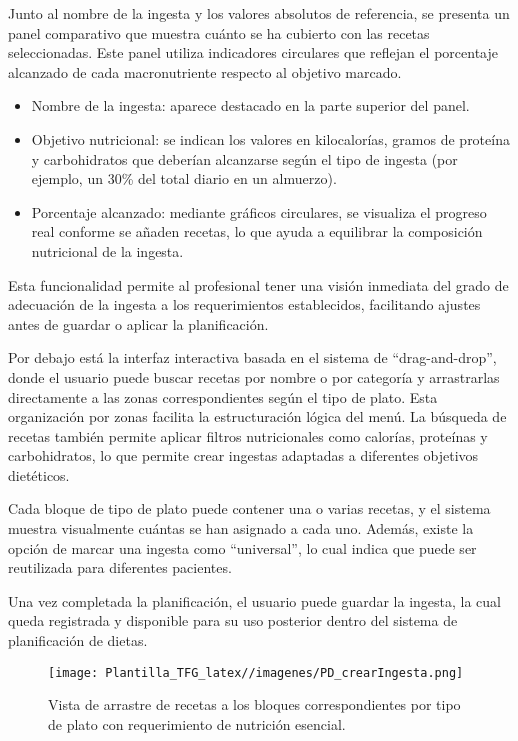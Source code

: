 Junto al nombre de la ingesta y los valores absolutos de referencia, se presenta un panel comparativo que muestra cuánto se ha cubierto con las recetas seleccionadas. Este panel utiliza indicadores circulares que reflejan el porcentaje alcanzado de cada macronutriente respecto al objetivo marcado.

\begin{itemize}
    \item Nombre de la ingesta: aparece destacado en la parte superior del panel.
    \item Objetivo nutricional: se indican los valores en kilocalorías, gramos de proteína y carbohidratos que deberían alcanzarse según el tipo de ingesta (por ejemplo, un 30\% del total diario en un almuerzo).
    \item Porcentaje alcanzado: mediante gráficos circulares, se visualiza el progreso real conforme se añaden recetas, lo que ayuda a equilibrar la composición nutricional de la ingesta.
\end{itemize}

Esta funcionalidad permite al profesional tener una visión inmediata del grado de adecuación de la ingesta a los requerimientos establecidos, facilitando ajustes antes de guardar o aplicar la planificación.

Por debajo está la interfaz interactiva basada en el sistema de ``drag-and-drop'', donde el usuario puede buscar recetas por nombre o por categoría y arrastrarlas directamente a las zonas correspondientes según el tipo de plato. Esta organización por zonas facilita la estructuración lógica del menú. La búsqueda de recetas también permite aplicar filtros nutricionales como calorías, proteínas y carbohidratos, lo que permite crear ingestas adaptadas a diferentes objetivos dietéticos.

Cada bloque de tipo de plato puede contener una o varias recetas, y el sistema muestra visualmente cuántas se han asignado a cada uno. Además, existe la opción de marcar una ingesta como ``universal'', lo cual indica que puede ser reutilizada para diferentes pacientes.

Una vez completada la planificación, el usuario puede guardar la ingesta, la cual queda registrada y disponible para su uso posterior dentro del sistema de planificación de dietas.

\begin{figure}[t]
    \centering
    \texttt{[image: Plantilla\_TFG\_latex//imagenes/PD\_crearIngesta.png]}
    \caption{Vista de arrastre de recetas a los bloques correspondientes por tipo de plato con requerimiento de nutrición esencial.}
    \label{fig:crear-ingesta-drag}
\end{figure}

